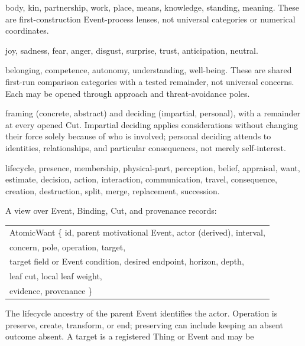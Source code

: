 \documentclass[11pt,a4paper]{article}
\begin{document}
\begin{description}[style=nextline]
  \item[Concurrent human-life process domains.] body, kin,
    partnership, work, place, means, knowledge, standing, meaning. These are
    first-construction Event-process lenses, not universal categories or
    numerical coordinates.
  \item[Emotion vocabulary $V_{\mathrm{emo}}$.] joy, sadness, fear, anger,
    disgust, surprise, trust, anticipation, neutral.
  \item[First-run concern vocabulary $V_{\mathrm{concern}}$.] belonging,
    competence, autonomy, understanding, well-being. These are shared
    first-run comparison categories with a tested remainder, not universal
    concerns. Each may be opened through approach and threat-avoidance poles.
  \item[Problem-solving modes.] framing (concrete, abstract) and deciding
    (impartial, personal), with a remainder at every opened Cut.
    Impartial deciding applies considerations without changing their force solely
    because of who is involved; personal deciding attends to identities,
    relationships, and particular consequences, not merely self-interest.
  \item[Event kinds (initial registry).] lifecycle, presence, membership,
    physical-part, perception, belief, appraisal, want, estimate, decision,
    action, interaction, communication, travel, consequence, creation,
    destruction, split, merge, replacement, succession.
  \item[AtomicWant.] A view over Event, Binding, Cut, and provenance
    records:
    \begin{center}
    \footnotesize\ttfamily
    \begin{tabular}{@{}l@{}}
    AtomicWant \{ id, parent motivational Event, actor (derived), interval,\\
    \qquad concern, pole, operation, target,\\
    \qquad target field or Event condition, desired endpoint, horizon, depth,\\
    \qquad leaf cut, local leaf weight,\\
    \qquad evidence, provenance \}
    \end{tabular}
    \end{center}
    The lifecycle ancestry of the parent Event identifies the actor. Operation
    is preserve, create, transform, or end; preserving can include keeping an
    absent outcome absent. A target is a registered Thing or Event and may be

\end{description}
\end{document}
